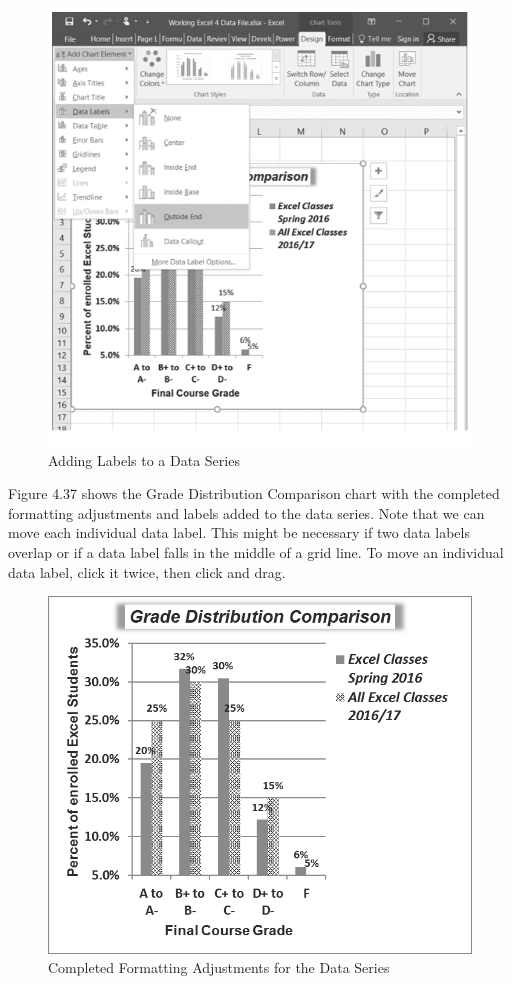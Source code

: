 \begin{figure}[H]
	\centering
	\includegraphics[width=\maxwidth{.95\linewidth}]{gfx/ch04_fig39}
	\caption{Adding Labels to a Data Series}
	\label{04:fig39}
\end{figure}


Figure 4.37 shows the Grade Distribution Comparison chart with the completed formatting
adjustments and labels added to the data series. Note that we can move each individual data label. This
might be necessary if two data labels overlap or if a data label falls in the middle of a grid line. To move
an individual data label, click it twice, then click and drag.



\begin{figure}[H]
	\centering
	\includegraphics[width=\maxwidth{.95\linewidth}]{gfx/ch04_fig40}
	\caption{Completed Formatting Adjustments for the Data Series}
	\label{04:fig40}
\end{figure}


